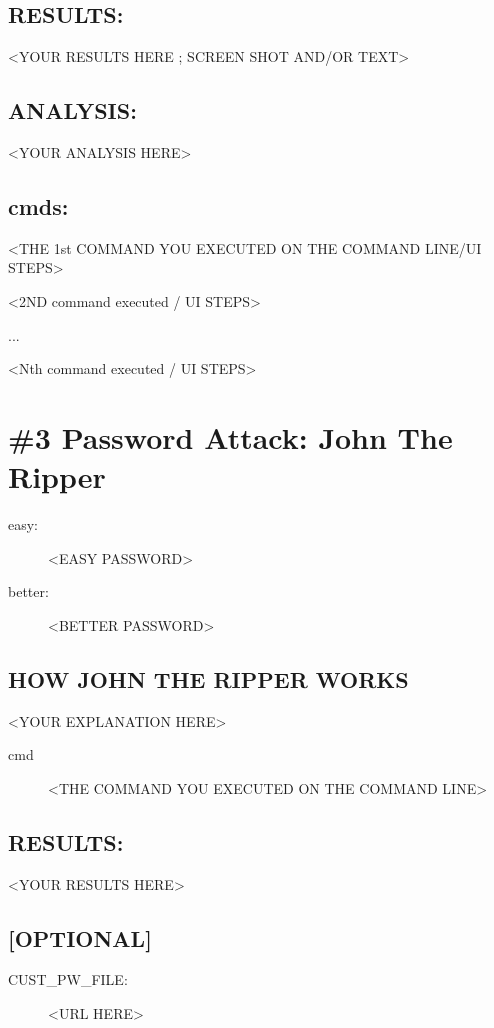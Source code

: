 \documentclass[letter]{article}
\begin{document}
\subsection*{RESULTS:}
<YOUR RESULTS HERE ; SCREEN SHOT AND/OR TEXT>

\subsection*{ANALYSIS:}
<YOUR ANALYSIS HERE>

\subsection*{cmds:}
\begin{enumerate}[label={[\arabic*]}]
\item <THE 1st COMMAND YOU EXECUTED ON THE COMMAND LINE/UI STEPS>
\item <2ND command executed / UI STEPS>
\item ...
\item <Nth command executed / UI STEPS>
\end{enumerate}


\section*{\#3 Password Attack: John The Ripper}
\begin{description}
\item [easy:] <EASY PASSWORD>
\item [better:] <BETTER PASSWORD>
\end{description}
\subsection*{HOW JOHN THE RIPPER WORKS}
<YOUR EXPLANATION HERE>

\begin{description}
\item [cmd] <THE COMMAND YOU EXECUTED ON THE COMMAND LINE>
\end{description}

\subsection*{RESULTS:}
<YOUR RESULTS HERE>

\subsection*{[OPTIONAL]}
\begin{description}
\item [CUST\_PW\_FILE:] <URL HERE>
\end{description}
\end{document}
